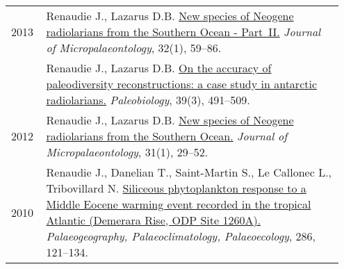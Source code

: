 \documentclass[11pt, a4paper]{article}
\begin{document}
\begin{longtable}{@{}p{0.1\linewidth} P{0.85\linewidth}@{}}
2013 & Renaudie J., Lazarus D.B. \href{http://dx.doi.org/10.1144/jmpaleo2011-025}{New species of Neogene radiolarians from the Southern Ocean - Part II.} \textit{Journal of Micropalaeontology}, 32(1), 59--86.\\
    & Renaudie J., Lazarus D.B. \href{http://dx.doi.org/10.1666/12016}{On the accuracy of paleodiversity reconstructions: a case study in antarctic radiolarians.} \textit{Paleobiology}, 39(3), 491--509.\\
2012 & Renaudie J., Lazarus D.B. \href{http://dx.doi.org/10.1144/0262-821X10-026}{New species of Neogene radiolarians from the Southern Ocean.} \textit{Journal of Micropalaeontology}, 31(1), 29--52.\\
2010 & Renaudie J., Danelian T., Saint-Martin S., Le Callonec L., Tribovillard N. \href{http://dx.doi.org/10.1016/j.palaeo.2009.12.004}{Siliceous phytoplankton response to a Middle Eocene warming event recorded in the tropical Atlantic (Demerara Rise, ODP Site 1260A).} \textit{Palaeogeography, Palaeoclimatology, Palaeoecology}, 286, 121--134.\\
\end{longtable}
\end{document}
